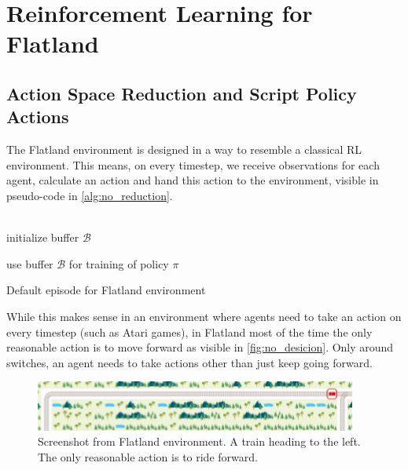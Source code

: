 \section{Reinforcement Learning for Flatland}
\label{rl_flatland}
\subsection*{Action Space Reduction and Script Policy Actions}\label{reduced_action_space}
The Flatland environment is designed in a way to resemble a classical RL environment. This means, on every timestep, we receive observations for each agent, calculate an action and hand this action to the environment, visible in pseudo-code in \autoref{alg:no_reduction}.\\\\
\begin{algorithm}[H]
	initialize buffer $\mathcal{B}$\\

	use buffer $\mathcal{B}$ for training of policy $\pi$
	\caption{Default episode for Flatland environment}
	\label{alg:no_reduction}
\end{algorithm}
While this makes sense in an environment where agents need to take an action on every timestep (such as Atari games), in Flatland most of the time the only reasonable action is to move forward as visible in \autoref{fig:no_desicion}. Only around switches, an agent needs to take actions other than just keep going forward.
\begin{figure}[H]
	\centering
	\includegraphics[width=300pt]{images/screenshot_no_decision.png}
	\caption{Screenshot from Flatland environment. A train heading to the left. The only reasonable action is to ride forward.}
	\label{fig:no_desicion}
\end{figure}
